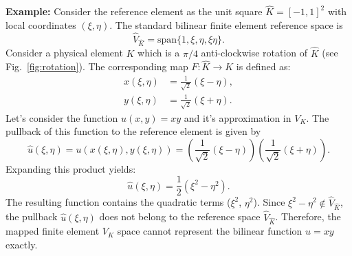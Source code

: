 \documentclass[a4paper]{article}
\theoremstyle{plain}
\theoremstyle{definition}
\theoremstyle{remark}
\begin{document}
\textbf{Example:} Consider the reference element as the unit square $\hat{K} = [-1,1]^2$ with local coordinates $(\xi, \eta)$. The standard bilinear finite element reference space is
$$
\hat{V}_{\hat{K}} = \text{span}\{1, \xi, \eta, \xi\eta\}.
$$
Consider a physical element $K$ which is a $\pi/4$ anti-clockwise rotation of $\hat{K}$ (see Fig.~\ref{fig:rotation}).  The corresponding map $F: \hat{K} \to K$ is defined as:
\begin{align*}
x(\xi, \eta) &= \frac{1}{\sqrt{2}}(\xi - \eta), \\
y(\xi, \eta) &= \frac{1}{\sqrt{2}}(\xi + \eta).
\end{align*}
Let's consider the function $u(x,y) = xy$ and it's approximation in $V_K$. The pullback of this function to the reference element is given by
$$
\hat{u}(\xi, \eta) = u(x(\xi, \eta), y(\xi, \eta)) = \left( \frac{1}{\sqrt{2}}(\xi - \eta) \right) \left( \frac{1}{\sqrt{2}}(\xi + \eta) \right).
$$
Expanding this product yields:
\begin{equation}
	\hat{u}(\xi, \eta) = \frac{1}{2}(\xi^2 - \eta^2).
\end{equation}
The resulting function contains the quadratic terms ($\xi^2$, $\eta^2$). Since $\xi^2 - \eta^2 \notin \hat{V}_{\hat{K}}$, the pullback $\hat{u}(\xi, \eta)$ does not belong to the reference space $\hat{V}_{\hat{K}}$. Therefore, the mapped finite element $V_K$ space cannot represent the bilinear function $u = xy$ exactly.
\end{document}
